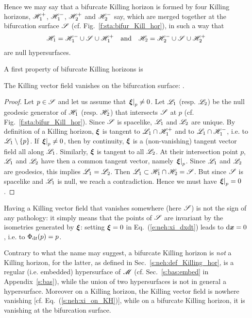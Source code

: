 Hence we may say that a bifurcate Killing horizon is formed by four Killing horizons,
$\mathscr{H}_1^+$, $\mathscr{H}_1^-$, $\mathscr{H}_2^+$ and $\mathscr{H}_2^-$ say,
which are merged together at the bifurcation surface $\mathscr{S}$ (cf. Fig.~\ref{f:sta:bifur_Kill_hor}), in such a way that
\[
    \mathscr{H}_1 = \mathscr{H}_1^- \cup \mathscr{S} \cup \mathscr{H}_1^+ \quad \mbox{and}\quad
    \mathscr{H}_2 = \mathscr{H}_2^- \cup \mathscr{S} \cup \mathscr{H}_2^+
\]
are null hypersurfaces.

A first property of bifurcate Killing horizons is
\begin{greybox}
The Killing vector field vanishes on the bifurcation surface:
\be
     .
\ee
\end{greybox}
\begin{proof}
Let $p\in \mathscr{S}$ and let us assume that $\left.\bm{\xi}\right| _p\not=0$.
Let $\mathscr{L}_1$ (resp. $\mathscr{L}_2$) be the null geodesic generator of $\mathscr{H}_1$
(resp. $\mathscr{H}_2$) that intersects $\mathscr{S}$ at $p$ (cf. Fig.~\ref{f:sta:bifur_Kill_hor}).
Since $\mathscr{S}$ is spacelike,
$\mathscr{L}_1$ and $\mathscr{L}_2$ are unique. By definition of a Killing horizon,
$\bm{\xi}$ is tangent to $\mathscr{L}_1\cap\mathscr{H}_1^+$ and to $\mathscr{L}_1\cap\mathscr{H}_1^-$,
i.e. to $\mathscr{L}_1\setminus\{p\}$.
If $\left.\bm{\xi}\right| _p \not=0$, then by continuity,
$\bm{\xi}$ is a (non-vanishing) tangent vector field all along $\mathscr{L}_1$.
Similarly, $\bm{\xi}$ is tangent to all $\mathscr{L}_2$.
At their intersection point $p$, $\mathscr{L}_1$ and $\mathscr{L}_2$ have then a common tangent
vector, namely $\left.\bm{\xi}\right| _p$. Since $\mathscr{L}_1$ and $\mathscr{L}_2$ are
geodesics, this implies $\mathscr{L}_1 = \mathscr{L}_2$. Then
$\mathscr{L}_1 \subset \mathscr{H}_1 \cap \mathscr{H}_2 = \mathscr{S}$. But since $\mathscr{S}$ is spacelike and
$\mathscr{L}_1$ is null, we reach a contradiction. Hence we must have
$\left.\bm{\xi}\right| _p = 0$.
\end{proof}

\begin{remark}
\label{r:sta:zero_Killing}
Having a Killing vector field that vanishes somewhere (here $\mathscr{S}$) is not the sign
of any pathology: it simply means that the points of $\mathscr{S}$ are invariant
by the isometries generated by $\bm{\xi}$:
setting $\bm{\xi}=0$ in Eq.~(\ref{e:neh:xi_dxdt}) leads to $\mathrm{d}\bm{x}=0$, i.e.
to $\Phi_{\mathrm{d} t}(p) = p$.
\end{remark}

\begin{remark}
Contrary to what the name may suggest, a bifurcate Killing horizon is \emph{not}
a Killing horizon, for the latter, as defined in Sec.~\ref{s:neh:def_Killing_hor},
is a regular (i.e. embedded) hypersurface
of $\mathscr{M}$ (cf. Sec.~\ref{s:bas:embed} in Appendix~\ref{s:bas}), while
the union of two hypersurfaces is not in general a hypersurface. Moreover
on a Killing horizon, the Killing vector field is nowhere vanishing
[cf. Eq.~(\ref{s:neh:xi_on_KH})], while on
a bifurcate Killing horizon, it is vanishing at the bifurcation surface.
\end{remark}

